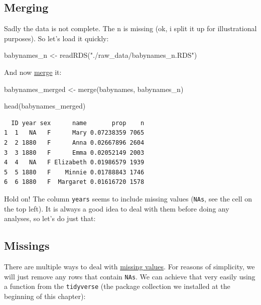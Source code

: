 \documentclass[
  letterpaper,
  DIV=11,
  numbers=noendperiod]{scrartcl}
\newenvironment{Shaded}{\begin{snugshade}}{\end{snugshade}}
\newcommand{\FunctionTok}[1]{\textcolor[rgb]{0.28,0.35,0.67}{#1}}
\newcommand{\NormalTok}[1]{\textcolor[rgb]{0.00,0.23,0.31}{#1}}
\newcommand{\OtherTok}[1]{\textcolor[rgb]{0.00,0.23,0.31}{#1}}
\newcommand{\StringTok}[1]{\textcolor[rgb]{0.13,0.47,0.30}{#1}}
\begin{document}
\hypertarget{merging}{%
\subsection{Merging}\label{merging}}

Sadly the data is not complete. The n is missing (ok, i split it up for
illustrational purposes). So let's load it quickly:

\begin{Shaded}
\begin{Highlighting}[]
\NormalTok{babynames\_n }\OtherTok{\textless{}{-}} \FunctionTok{readRDS}\NormalTok{(}\StringTok{"./raw\_data/babynames\_n.RDS"}\NormalTok{)}
\end{Highlighting}
\end{Shaded}

And now \href{manipulation.qmd\#Merging}{merge} it:

\begin{Shaded}
\begin{Highlighting}[]
\NormalTok{babynames\_merged }\OtherTok{\textless{}{-}} \FunctionTok{merge}\NormalTok{(babynames, babynames\_n)}

\FunctionTok{head}\NormalTok{(babynames\_merged)}
\end{Highlighting}
\end{Shaded}

\begin{verbatim}
  ID year sex      name       prop    n
1  1   NA   F      Mary 0.07238359 7065
2  2 1880   F      Anna 0.02667896 2604
3  3 1880   F      Emma 0.02052149 2003
4  4   NA   F Elizabeth 0.01986579 1939
5  5 1880   F    Minnie 0.01788843 1746
6  6 1880   F  Margaret 0.01616720 1578
\end{verbatim}

Hold on! The column \texttt{years} seems to include missing values
(\texttt{NA\textquotesingle{}s}, see the cell on the top left). It is
always a good idea to deal with them before doing any analyses, so let's
do just that:

\hypertarget{missings}{%
\subsection{Missings}\label{missings}}

There are multiple ways to deal with
\href{http://localhost:5462/manipulation.html\#missing-values}{missing
values}. For reasons of simplicity, we will just remove any rows that
contain \texttt{NA\textquotesingle{}s}. We can achieve that very easily
using a function from the \texttt{tidyverse} (the package collection we
installed at the beginning of this chapter):
\end{document}

